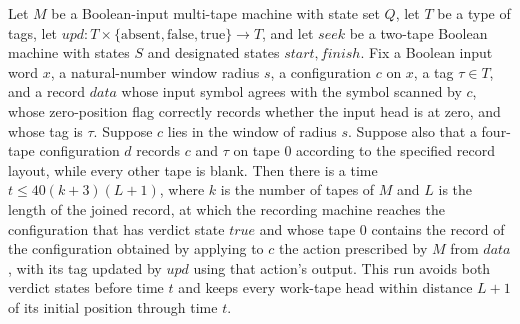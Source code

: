 \begin{theorem}
\label{Turing.recordStep_apply_run}
\leanok
{}
Let $M$ be a Boolean-input multi-tape machine with state set $Q$, let $T$ be a type of
tags, let $upd:T\times\{\text{absent},\text{false},\text{true}\}\to T$, and let $seek$
be a two-tape Boolean machine with states $S$ and designated states $start,finish$. Fix
a Boolean input word $x$, a natural-number window radius $s$, a configuration $c$ on
$x$, a tag $\tau\in T$, and a record $data$ whose input symbol agrees with the symbol
scanned by $c$, whose zero-position flag correctly records whether the input head is at
zero, and whose tag is $\tau$. Suppose $c$ lies in the window of radius $s$. Suppose
also that a four-tape configuration $d$ records $c$ and $\tau$ on tape $0$ according to
the specified record layout, while every other tape is blank. Then there is a time $t\le
40(k+3)(L+1)$, where $k$ is the number of tapes of $M$ and $L$ is the length of the
joined record, at which the recording machine reaches the configuration that has verdict
state $true$ and whose tape $0$ contains the record of the configuration obtained by
applying to $c$ the action prescribed by $M$ from $data$, with its tag updated by $upd$
using that action's output. This run avoids both verdict states before time $t$ and
keeps every work-tape head within distance $L+1$ of its initial position through time
$t$.
\end{theorem}

